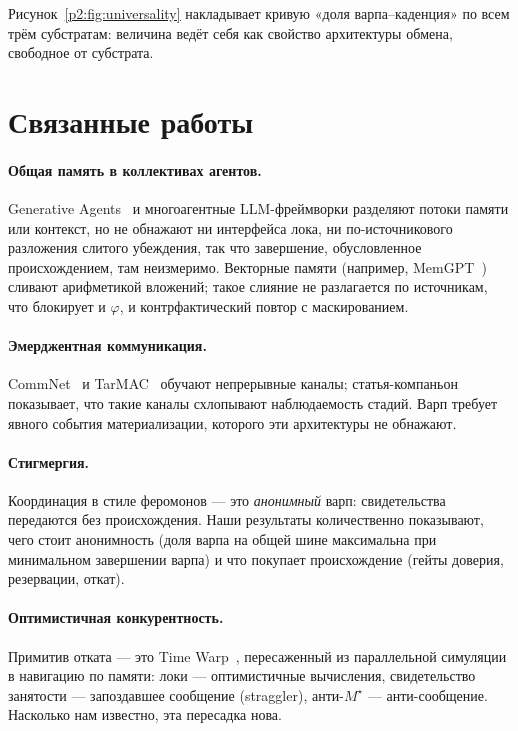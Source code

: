 \documentclass{article}
\newcommand{\mstar}{M^{\star}}
\begin{document}
Рисунок~\ref{p2:fig:universality} накладывает кривую «доля
варпа--каденция» по всем трём субстратам: величина ведёт себя как
свойство архитектуры обмена, свободное от субстрата.

\section{Связанные работы}
\label{p2:sec:related}

\paragraph{Общая память в коллективах агентов.} Generative
Agents~\cite{park2023generative} и многоагентные LLM-фреймворки
разделяют потоки памяти или контекст, но не обнажают ни интерфейса
лока, ни по-источникового разложения слитого убеждения, так что
завершение, обусловленное происхождением, там неизмеримо. Векторные
памяти (например, MemGPT~\cite{packer2023memgpt}) сливают
арифметикой вложений; такое слияние не разлагается по источникам, что
блокирует и $\varphi$, и контрфактический повтор с маскированием.
\paragraph{Эмерджентная коммуникация.} CommNet~\cite{sukhbaatar2016commnet}
и TarMAC~\cite{das2019tarmac} обучают непрерывные каналы;
статья-компаньон показывает, что такие каналы схлопывают
наблюдаемость стадий. Варп требует явного события материализации,
которого эти архитектуры не обнажают.
\paragraph{Стигмергия.} Координация в стиле феромонов --- это
\emph{анонимный} варп: свидетельства передаются без происхождения.
Наши результаты количественно показывают, чего стоит анонимность
(доля варпа на общей шине максимальна при минимальном завершении
варпа) и что покупает происхождение (гейты доверия, резервации,
откат).
\paragraph{Оптимистичная конкурентность.} Примитив отката --- это
Time Warp~\cite{jefferson1985}, пересаженный из параллельной
симуляции в навигацию по памяти: локи --- оптимистичные вычисления,
свидетельство занятости --- запоздавшее сообщение (straggler),
анти-$\mstar$ --- анти-сообщение. Насколько нам известно, эта
пересадка нова.
\end{document}
